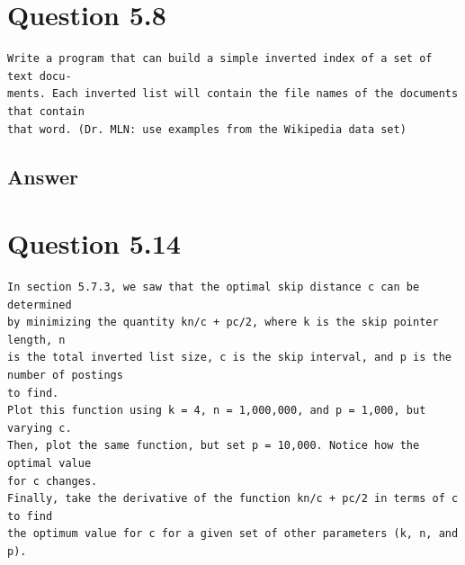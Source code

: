 \documentclass[11pt]{article}
\newenvironment{code}{\captionsetup{type=listing}}{}
\begin{document}
\section{Question 5.8}
\begin{verbatim}
Write a program that can build a simple inverted index of a set of text docu-
ments. Each inverted list will contain the file names of the documents that contain
that word. (Dr. MLN: use examples from the Wikipedia data set) 
\end{verbatim}
\subsection{Answer}
\begin{code}
	 \label{code:iidx}
\end{code}
\newpage
\section{Question 5.14}
\begin{verbatim}
In section 5.7.3, we saw that the optimal skip distance c can be determined
by minimizing the quantity kn/c + pc/2, where k is the skip pointer length, n
is the total inverted list size, c is the skip interval, and p is the number of postings
to find.
Plot this function using k = 4, n = 1,000,000, and p = 1,000, but varying c.
Then, plot the same function, but set p = 10,000. Notice how the optimal value
for c changes.
Finally, take the derivative of the function kn/c + pc/2 in terms of c to find
the optimum value for c for a given set of other parameters (k, n, and p).
\end{verbatim}
\end{document}
